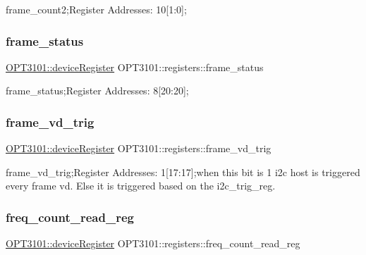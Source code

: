 frame\+\_\+count2;Register Addresses\+: 10\mbox{[}1\+:0\mbox{]}; 

\mbox{\label{class_o_p_t3101_1_1registers_ab8c08b83252a06c3c59b4b33b4b1a8ba}} 
\subsubsection{\texorpdfstring{frame\+\_\+status}{frame\_status}}
{\footnotesize\ttfamily \mbox{\hyperlink{class_o_p_t3101_1_1device_register}{O\+P\+T3101\+::device\+Register}} O\+P\+T3101\+::registers\+::frame\+\_\+status}



frame\+\_\+status;Register Addresses\+: 8\mbox{[}20\+:20\mbox{]}; 

\mbox{\label{class_o_p_t3101_1_1registers_a853a700e44ec7b0eceb21f2c5d03a37a}} 
\subsubsection{\texorpdfstring{frame\+\_\+vd\+\_\+trig}{frame\_vd\_trig}}
{\footnotesize\ttfamily \mbox{\hyperlink{class_o_p_t3101_1_1device_register}{O\+P\+T3101\+::device\+Register}} O\+P\+T3101\+::registers\+::frame\+\_\+vd\+\_\+trig}



frame\+\_\+vd\+\_\+trig;Register Addresses\+: 1\mbox{[}17\+:17\mbox{]};when this bit is \textquotesingle{}1\textquotesingle{} i2c host is triggered every frame vd. Else it is triggered based on the i2c\+\_\+trig\+\_\+reg. 

\mbox{\label{class_o_p_t3101_1_1registers_a0d343738560c0bc418f34b458735a811}} 
\subsubsection{\texorpdfstring{freq\+\_\+count\+\_\+read\+\_\+reg}{freq\_count\_read\_reg}}
{\footnotesize\ttfamily \mbox{\hyperlink{class_o_p_t3101_1_1device_register}{O\+P\+T3101\+::device\+Register}} O\+P\+T3101\+::registers\+::freq\+\_\+count\+\_\+read\+\_\+reg}



